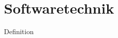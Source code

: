 \documentclass[%
a4paper,
12pt,		%
leqno,		%
fleqn,	    %
]
{scrartcl}
\begin{document}

\section{Softwaretechnik}
\label{sec:Softwaretechnik}

Definition

\end{document}
